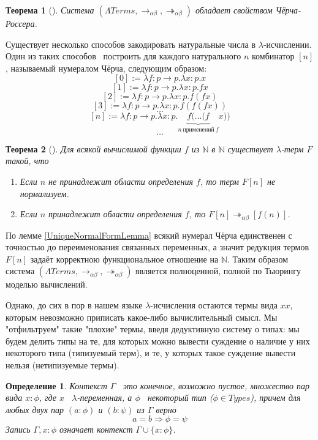 \documentclass{article}[12pt]
\newtheorem{theorem}{Теорема}
\newtheorem{definition}{Определение}
\newcommand{\dash}{\textemdash\ }
\begin{document}
\begin{theorem}[\cite{SorUrz06}]
    Система $(\Lambda Terms, \rightarrow_{\alpha \beta}, \twoheadrightarrow_{\alpha \beta})$ обладает
    свойством Чёрча-Россера.
\end{theorem}

Существует несколько способов закодировать натуральные числа в $\lambda$-исчислении. Один из таких
способов \dash построить для каждого натурального $n$ комбинатор $[n]$, называемый нумералом Чёрча,
следующим образом:
$$[0] := \lambda f : p \rightarrow p . \lambda x : p . x$$
$$[1] := \lambda f : p \rightarrow p . \lambda x : p . fx$$
$$[2] := \lambda f : p \rightarrow p . \lambda x : p . f (fx)$$
$$[3] := \lambda f : p \rightarrow p . \lambda x : p . f (f (fx))$$
$$ \dots $$
$$[n] := \lambda f : p \rightarrow p. \lambda x : p . \underbrace{f(\dots (f}_{n\ \text{применений}\ f} x))$$
$$ \dots $$

\begin{theorem}[\cite{SorUrz06}]
    Для всякой вычислимой функции $f$ из $\mathbb{N}$ в $\mathbb{N}$ существует
    $\lambda$-терм $F$ такой, что
    \begin{enumerate}
        \item Если $n$ не принадлежит области определения $f$, то терм $F[n]$ не нормализуем.
        \item Если $n$ принадлежит области определения $f$, то $F[n] \twoheadrightarrow_{\alpha \beta} [f(n)]$.
    \end{enumerate}
\end{theorem}

По лемме \ref{UniqueNormalFormLemma} всякий нумерал Чёрча единственен с точностью до переименования
связанных переменных, а значит редукция термов $F[n]$ задаёт корректною функциональное отношение на
$\mathbb{N}$. Таким образом система $(\Lambda Terms, \rightarrow_{\alpha \beta}, \twoheadrightarrow_{\alpha \beta})$
является полноценной, полной по Тьюрингу моделью вычислений.

Однако, до сих в пор в нашем языке $\lambda$-исчисления остаются термы вида $xx$, которым невозможно приписать
какое-либо вычислительный смысл. Мы "отфильтруем" такие "плохие" термы, введя дедуктивную систему о типах:
мы будем делить типы на те, для которых можно вывести суждение о наличие у них некоторого типа (типизуемый терм),
и те, у которых такое суждение вывести нельзя (нетипизуемые термы).

\begin{definition}
    \label{ContextDefinition}
    Контекст $\Gamma$ \dash это конечное, возможно пустое, множество пар вида $x : \phi$, где $x$ \dash $\lambda$-переменная,
    а $\phi$ \dash некоторый тип ($\phi \in Types$), причем для любых двух пар $(a : \phi)$ и $(b : \psi)$ из
    $\Gamma$ верно
    $$a = b \Rightarrow \phi = \psi$$
    Запись $\Gamma, x : \phi$ означает контекст $\Gamma \cup \{x: \phi\}$.
\end{definition}
\end{document}
